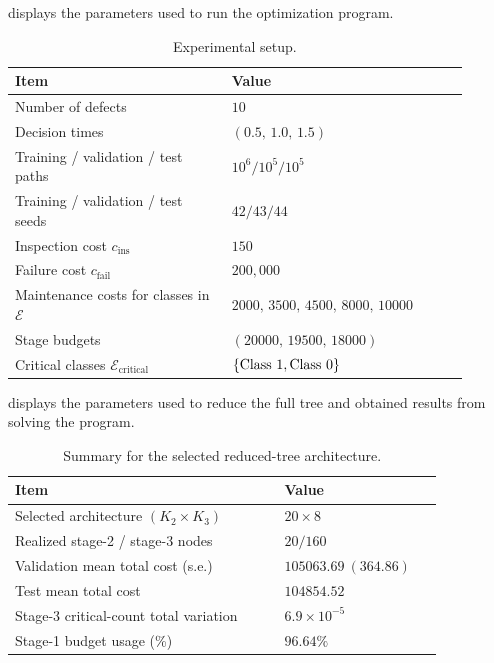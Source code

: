 \documentclass{article}
\begin{document}
 displays the parameters used to run the optimization program.
\begin{table}[htb!]
\centering
\caption{Experimental setup.} \label{tab:setup}
\begin{tabular}{p{0.43\linewidth}p{0.47\linewidth}}
\toprule
Item & Value \\
\midrule
Number of defects & \(10\) \\
Decision times & \((0.5,\,1.0,\,1.5)\) \\
Training / validation / test paths & \(10^6 / 10^5 / 10^5\) \\
Training / validation / test seeds & \(42 / 43 / 44\) \\
Inspection cost \(c_{\mathrm{ins}}\) & \(150\) \\
Failure cost \(c_{\mathrm{fail}}\) & \(200{,}000\) \\
Maintenance costs for classes in $\mathcal E$ & \(2000,\,3500,\,4500,\,8000,\,10000\) \\
Stage budgets & \((20000,\,19500,\,18000)\) \\
Critical classes $\mathcal E_{\text{critical}}$ & \(\{ \text{Class } $1$, \text{Class } $0$\}\) \\
\bottomrule
\end{tabular}
\end{table}

 displays the parameters used to reduce the full tree and obtained results from solving the program.
\begin{table}[htb!]
\centering
\caption{Summary for the selected reduced-tree architecture.} \label{tab:reduced_tree}
\begin{tabular}{p{0.55\linewidth}p{0.30\linewidth}}
\toprule
Item & Value \\
\midrule
Selected architecture $(K_2 \times K_3)$ & $20\times 8$ \\
Realized stage-2 / stage-3 nodes & $20 / 160$ \\
Validation mean total cost (s.e.) & $105063.69\ (364.86)$ \\
Test mean total cost & $104854.52$ \\
Stage-3 critical-count total variation & $6.9\times 10^{-5}$ \\
Stage-1 budget usage (\%) & $96.64\%$ \\
\bottomrule
\end{tabular}
\end{table}
\end{document}
